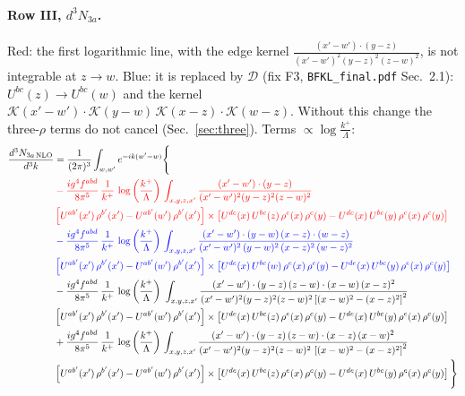 \documentclass[10pt]{article}
\numberwithin{equation}{section}
\newcommand{\new}[1]{{\color{blue}#1}}
\newcommand{\old}[1]{{\color{red}#1}}
\newcommand{\nc}{\color{blue}}
\newcommand{\rc}{\color{red}}
\begin{document}
\paragraph{Row III, $d^3N_{3a}$.}
\old{Red}: the first logarithmic line, with the edge kernel $\frac{(x'-w')\cdot(y-z)}{(x'-w')^2(y-z)^2(z-w)^2}$, is not integrable at $z\to w$. \new{Blue}: it is replaced by $\mathcal D$ (fix F3, \texttt{BFKL\_final.pdf} Sec.~2.1): $U^{bc}(z)\to U^{bc}(w)$ and the kernel $\mathcal K(x'-w')\cdot\mathcal K(y-w)\,\mathcal K(x-z)\cdot\mathcal K(w-z)$. Without this change the three-$\rho$ terms do not cancel (Sec.~\ref{sec:three}).
\noindent Terms $\propto\log\frac{k^+}{\Lambda}$:
\begin{align}
\frac{d^{3}N_{3a\,\rm NLO}}{d^{3}k} & = \frac{1}{(2\pi)^{3}}\int_{w,w'}e^{-ik(w'-w)}\Bigg\{\notag \\
& \rc  -\frac{ig^{4}f^{abd}}{8\pi^{5}}\,\frac{1}{k^{+}}\,\log{\left(\frac{k^{+}}{\Lambda}\right)}\,\int_{x,y,z,x'}
\frac{(x'-w')\cdot(y-z)}{(x'-w')^{2}(y-z)^{2}(z-w)^{2}}\notag \\ & \rc  \left[U^{ab'}(x')\,\rho^{b'}(x')-U^{ab'}(w')\, \rho^{b'}(x')\right]\times \left[U^{de}(x)\,U^{bc}(z)\, \rho^{e}(x)\,\rho^{c}(y)-U^{de}(x)\,U^{bc}(y)\,\rho^{e}(x)\,\rho^{c}(y)\right] \notag \\
& \nc  -\frac{ig^{4}f^{abd}}{8\pi^{5}}\,\frac{1}{k^{+}}\,\log{\left(\frac{k^{+}}{\Lambda}\right)}\,\int_{x,y,z,x'}\frac{(x'-w')\cdot(y-w)\,(x-z)\cdot(w-z)}{(x'-w')^{2}\,(y-w)^{2}\,(x-z)^{2}\,(w-z)^{2}}\notag \\ & \nc  \left[U^{ab'}(x')\,\rho^{b'}(x')-U^{ab'}(w')\, \rho^{b'}(x')\right]\times \left[U^{de}(x)\,U^{bc}(w)\, \rho^{e}(x)\,\rho^{c}(y)-U^{de}(x)\,U^{bc}(y)\,\rho^{e}(x)\,\rho^{c}(y)\right] \notag \\
& -\frac{ig^{4}f^{abd}}{8\pi^{5}}\,\frac{1}{k^{+}}\,\log{\left(\frac{k^{+}}{\Lambda}\right)}\,\,\int_{x,y,z,x'}
\frac{(x'-w')\cdot(y-z)\,(z-w)\cdot(x-w)\,(x-z)^{2}}{(x'-w')^{2}(y-z)^{2}(z-w)^{2}\left[(x-w)^{2}-(x-z)^{2}\right]^{2}}\notag \\ & \left[U^{ab'}(x')\,\rho^{b'}(x')-U^{ab'}(w')\, \rho^{b'}(x')\right]\times \left[U^{de}(x)\,U^{bc}(z)\, \rho^{e}(x)\,\rho^{c}(y)-U^{de}(x)\,U^{bc}(y)\,\rho^{e}(x)\,\rho^{c}(y)\right] \notag \\
& +\frac{ig^{4}f^{abd}}{8\pi^{5}}\,\frac{1}{k^{+}}\,\log{\left(\frac{k^{+}}{\Lambda}\right)}\,\int_{x,y,z,x'}
\frac{(x'-w')\cdot(y-z)\,(z-w)\cdot(x-z)\,(x-w)^{2}}{(x'-w')^{2}(y-z)^{2}(z-w)^{2}\,\left[(x-w)^{2}-(x-z)^{2}\right]^{2}}\notag \\ & \left[U^{ab'}(x')\,\rho^{b'}(x')-U^{ab'}(w')\, \rho^{b'}(x')\right]\times \left[U^{de}(x)\,U^{bc}(z)\, \rho^{e}(x)\,\rho^{c}(y)-U^{de}(x)\,U^{bc}(y)\,\rho^{e}(x)\,\rho^{c}(y)\right]\Bigg\} \label{eq:J:G1IIIN3a}
\end{align}
\end{document}
